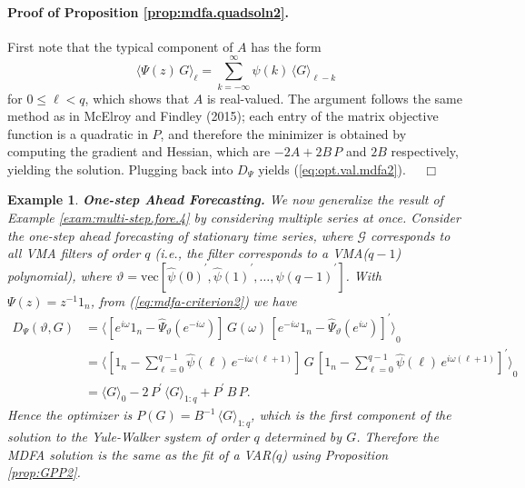 \documentclass[a4paper]{book}
\newtheorem{Example}{Example}
\begin{document}
\paragraph{Proof of Proposition \ref{prop:mdfa.quadsoln2}.}
 First note that the typical component of $A$ has the form
\begin{equation}
 \label{eq:psi.g.comp2}
   { \langle \Psi (z) \, G \rangle }_{\ell} = \sum_{k = - \infty}^{\infty} \psi (k) \,
	 { \langle G \rangle }_{\ell-k}
\end{equation}
 for $0 \leq \ell < q$,  which shows that $A$ is real-valued. 
 The argument follows the same method as in McElroy and Findley (2015);
 each entry of the matrix objective function is a quadratic in $P$, and therefore
  the minimizer is obtained 
 by computing the gradient and Hessian, which are 
  $-2 A + 2 B \, P$ and   $2 B$ respectively,
  yielding the solution.  Plugging back into $D_{\Psi}$ yields (\ref{eq:opt.val.mdfa2}).
$\quad \Box$


 
\begin{Example} {\bf One-step Ahead Forecasting.}  \rm
\label{exam:multi-step.fore.4-alt}
 We now generalize the result of Example \ref{exam:multi-step.fore.4} by considering
  multiple series at once.   Consider the   one-step ahead forecasting of 
  stationary time series, where 
 $\mathcal{G} $ corresponds to   all VMA filters of   order $q$
  (i.e., the filter corresponds to a VMA($q-1$) polynomial), where  
 $ \vartheta  = \mbox{vec} [{\widehat{\psi} (0) }^{\prime},
 {\widehat{\psi} (1) }^{\prime},   \ldots,
  {\widehat{\psi} (q-1) }^{\prime} ]$.
 With $\Psi (z) = z^{-1} 1_n$, from (\ref{eq:mdfa-criterion2}) we have 
\begin{align*}
 D_{\Psi} (\vartheta, G) & = 
 { \langle  \left[  e^{i \omega} 1_n -  \widehat{\Psi}_{\vartheta} (e^{-i \omega}) \right] \,   G (\omega) \,
  {  \left[ e^{-i \omega}  1_n  -  \widehat{\Psi}_{\vartheta} (e^{i \omega}) \right] }^{\prime} \rangle }_0 \\
 & = { \langle  \left[ 1_n -  \sum_{\ell = 0}^{q-1} \widehat{\psi} (\ell)
    \, e^{-i \omega  (\ell+1) } \right] \, 
  G \,   {  \left[ 1_n  -   \sum_{\ell = 0}^{q-1} \widehat{\psi} (\ell) 
  \, e^{i \omega (\ell+1 ) } \right]
  }^{\prime} \rangle }_0 \\
 & = { \langle G \rangle }_0 - 2 \, P^{\prime} \, { \langle G \rangle }_{1:q} 
    + P^{\prime} \, B \, P.
\end{align*}
 Hence the  optimizer is   $ P (G) = B^{-1} \,    { \langle G \rangle }_{1:q}$,
 which is the first component of the solution to the Yule-Walker system of order 
  $q$ determined by $G$.
  Therefore the MDFA solution is the same as the fit of a VAR($q$) using 
 Proposition \ref{prop:GPP2}.
\end{Example}
 
\end{document}
